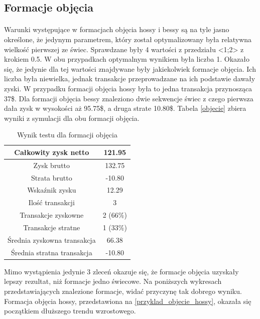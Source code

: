 \documentclass[pdflatex,11pt]{aghdpl}
\begin{document}
\subsection{Formacje objęcia}
\paragraph{}

Warunki występujące w formacjach objęcia hossy i bessy są na tyle jasno określone, że jedynym parametrem, który został optymalizowany była relatywna wielkość pierwszej ze świec. Sprawdzane były 4 wartości z przedziału <1;2> z krokiem 0.5. W obu przypadkach optymalnym wynikiem była liczba 1. Okazało się, że jedynie dla tej wartości znajdywane były jakiekolwiek formacje objęcia. Ich liczba była niewielka, jednak transakcje przeprowadzane na ich podstawie dawały zyski. W przypadku formacji objęcia hossy była to jedna transakcja przynosząca 37\$. Dla formacji objęcia bessy znaleziono dwie sekwencje świec z czego pierwsza dała zysk w wysokości aż 95.75\$, a druga strate 10.80\$. Tabela \ref{objecie} zbiera wyniki z symulacji dla obu formacji objęcia.
\begin{table}[h!]
\begin{center}
\begin{tabular}{|c|c|}
\hline 
Całkowity zysk netto & 121.95\\
\hline
Zysk brutto & 132.75 \\
\hline
Strata brutto & -10.80 \\
\hline
Wskaźnik zysku & 12.29 \\
\hline
\hline
Ilość transakcji & 3 \\
\hline
Transakcje zyskowne & 2 (66\%) \\
\hline
Transakcje stratne & 1 (33\%) \\
\hline
\hline
Średnia zyskowna transakcja & 66.38 \\
\hline
Średnia stratna transakcja & -10.80 \\
\hline
\end{tabular} 
\caption{Wynik testu dla formacji objęcia}
\label{raport_objecie}
\end{center}
\end{table}
Mimo wystąpienia jedynie 3 zleceń okazuje się, że formacje objęcia uzyskały lepszy rezultat, niż formacje jedno świecowe. Na poniższych wykresach przedstawiających znalezione formacje, widać przyczynę tak dobrego wyniku. Formacja objęcia hossy, przedstawiona na \ref{przyklad_objecie_hossy}, okazała się początkiem dłuższego trendu wzrostowego. 
\end{document}

